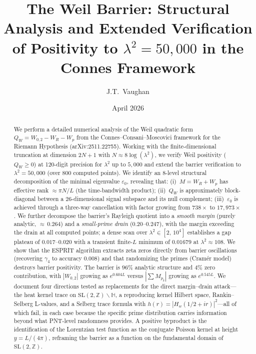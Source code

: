\documentclass[11pt,a4paper]{article}
\title{The Weil Barrier: Structural Analysis and Extended Verification\\of Positivity to $\lambda^2=50{,}000$ in the Connes Framework}
\author{J.T.\ Vaughan}
\date{April 2026}
\begin{document}
\maketitle

\begin{abstract}
We perform a detailed numerical analysis of the Weil quadratic form $Q_W = W_{0,2} - W_R - W_p$ from the Connes--Consani--Moscovici framework for the Riemann Hypothesis (arXiv:2511.22755). Working with the finite-dimensional truncation at dimension $2N+1$ with $N \approx 8\log(\lambda^2)$, we verify Weil positivity ($Q_W \geq 0$) at 120-digit precision for $\lambda^2$ up to $5{,}000$ and extend the barrier verification to $\lambda^2 = 50{,}000$ (over 800 computed points). We identify an 8-level structural decomposition of the minimal eigenvalue $\varepsilon_0$, revealing that: (i)~$M = W_R + W_p$ has effective rank $\approx \pi N/L$ (the time-bandwidth product); (ii)~$Q_W$ is approximately block-diagonal between a $26$-dimensional signal subspace and its null complement; (iii)~$\varepsilon_0$ is achieved through a three-way cancellation with factor growing from $738\times$ to $17{,}973\times$. We further decompose the barrier's Rayleigh quotient into a \emph{smooth margin} (purely analytic, ${\approx}\,0.264$) and a \emph{small-prime drain} ($0.20\text{--}0.247$), with the margin exceeding the drain at all computed points; a dense scan over $\lambda^2 \in [2,\, 10^4]$ establishes a gap plateau of $0.017\text{--}0.020$ with a transient finite-$L$ minimum of $0.01679$ at $\lambda^2 \approx 108$. We show that the ESPRIT algorithm extracts zeta zeros directly from barrier oscillations (recovering $\gamma_4$ to accuracy $0.008$) and that randomizing the primes (Cram\'er model) destroys barrier positivity. The barrier is $96\%$ analytic structure and $4\%$ zero contribution, with $|W_{0,2}|$ growing as $e^{0.604L}$ versus $|\sum M_{p_k}|$ growing as $e^{0.545L}$. We document four directions tested as replacements for the direct margin--drain attack---the heat kernel trace on $\mathrm{SL}(2,\mathbb{Z}) \backslash \mathbb{H}$, a reproducing kernel Hilbert space, Rankin--Selberg L-values, and a Selberg trace formula with $h(r) = |H_w(1/2+ir)|^2$---all of which fail, in each case because the specific prime distribution carries information beyond what PNT-level randomness provides. A positive byproduct is the identification of the Lorentzian test function as the conjugate Poisson kernel at height $y = L/(4\pi)$, reframing the barrier as a function on the fundamental domain of $\mathrm{SL}(2,\mathbb{Z})$.
\end{abstract}
\end{document}

